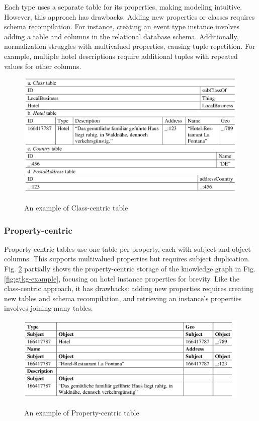 \documentclass[12pt]{article}
\begin{document}
Each type uses a separate table for its properties, making modeling intuitive. However, this approach has drawbacks. Adding new properties or classes requires schema recompilation. For instance, creating an event type instance involves adding a table and columns in the relational database schema. Additionally, normalization struggles with multivalued properties, causing tuple repetition. For example, multiple hotel descriptions require additional tuples with repeated values for other columns.
\begin{figure}
    \includegraphics[width=\linewidth]{imgs/Class-centric.jpeg}
    \label{fig:Class-centric-example}
    \caption{An example of Class-centric table}
\end{figure}
\subsubsection{Property-centric}
Property-centric tables use one table per property, each with subject and object columns. This supports multivalued properties but requires subject duplication. Fig. \ref{fig:Property-centric-example} partially shows the property-centric storage of the knowledge graph in Fig. \ref{fig:gtkg-example}, focusing on hotel instance properties for brevity. Like the class-centric approach, it has drawbacks: adding new properties requires creating new tables and schema recompilation, and retrieving an instance’s properties involves joining many tables.
\begin{figure}
    \includegraphics[width=\linewidth]{imgs/Property-centric.jpeg}
    \label{fig:Property-centric-example}
    \caption{An example of Property-centric table}
\end{figure}
\end{document}
